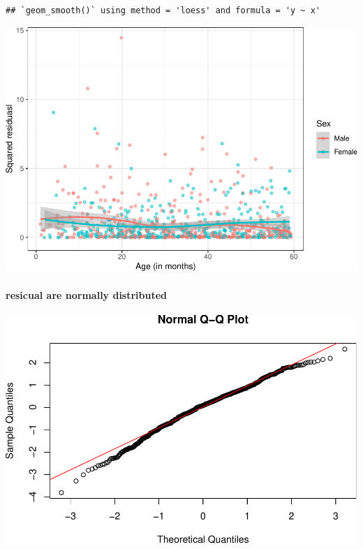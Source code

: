 \documentclass[
]{article}
\newenvironment{Shaded}{\begin{snugshade}}{\end{snugshade}}
\newcommand{\AttributeTok}[1]{\textcolor[rgb]{0.13,0.29,0.53}{#1}}
\newcommand{\FunctionTok}[1]{\textcolor[rgb]{0.13,0.29,0.53}{\textbf{#1}}}
\newcommand{\NormalTok}[1]{#1}
\newcommand{\SpecialCharTok}[1]{\textcolor[rgb]{0.81,0.36,0.00}{\textbf{#1}}}
\newcommand{\StringTok}[1]{\textcolor[rgb]{0.31,0.60,0.02}{#1}}
\begin{document}
\begin{verbatim}
## `geom_smooth()` using method = 'loess' and formula = 'y ~ x'
\end{verbatim}

\includegraphics{ProblemSet3_Siyu_Zou_files/figure-latex/unnamed-chunk-17-1.pdf}

\hypertarget{resicual-are-normally-distributed}{%
\paragraph{resicual are normally
distributed}\label{resicual-are-normally-distributed}}

\begin{Shaded}
\end{Shaded}

\includegraphics{ProblemSet3_Siyu_Zou_files/figure-latex/unnamed-chunk-18-1.pdf}
\end{document}
